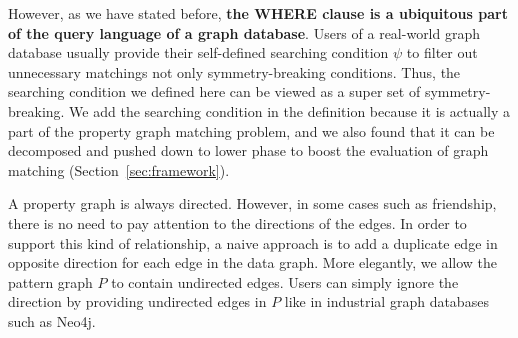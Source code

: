 However, as we have stated before, \textbf{the WHERE clause is a ubiquitous part of the query language of a graph database}.
Users of a real-world graph database usually provide their self-defined searching condition $\psi$ to filter out unnecessary matchings not only symmetry-breaking conditions.
Thus, the searching condition we defined here can be viewed as a super set of symmetry-breaking.
We add the searching condition in the definition because it is actually a part of the property graph matching problem,
and we also found that it can be decomposed and pushed down to lower phase to boost the evaluation of graph matching (Section~\ref{sec:framework}).

A property graph is always directed.
However, in some cases such as friendship, there is no need to pay attention to the directions of the edges.
In order to support this kind of relationship, a naive approach is to add a duplicate edge in opposite direction for each edge in the data graph.
More elegantly, we allow the pattern graph $P$ to contain undirected edges.
Users can simply ignore the direction by providing undirected edges in $P$ like in industrial graph databases such as Neo4j.
